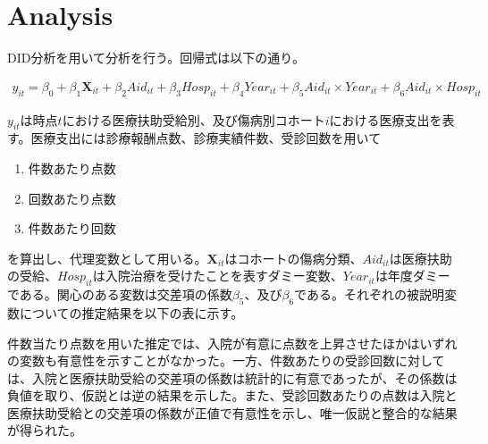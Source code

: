 \documentclass{jsarticle}
\begin{document}
\section{Analysis}

DID分析を用いて分析を行う。回帰式は以下の通り。

 \begin{align*}
 y_{it} = \beta_0 + \beta_1 \mathbf{X}_{it} + \beta_2 \textit{Aid}_{it} + \beta_3 \textit{Hosp}_{it} +
 \beta_4 \textit{Year}_{it} + \beta_5 \textit{Aid}_{it} \times \textit{Year}_{it} + \beta_6 \textit{Aid}_{it} \times \textit{Hosp}_{it} 
 \end{align*}

$y_{it}$は時点$t$における医療扶助受給別、及び傷病別コホート$i$における医療支出を表す。医療支出には診療報酬点数、診療実績件数、受診回数を用いて

 \begin{enumerate}
 
 \item 件数あたり点数
 
 \item 回数あたり点数
 
 \item 件数あたり回数
 
 \end{enumerate}

を算出し、代理変数として用いる。$\mathbf{X}_{it}$はコホートの傷病分類、$\textit{Aid}_{it}$は医療扶助の受給、$\textit{Hosp}_{it}$は入院治療を受けたことを表すダミー変数、$\textit{Year}_{it}$は年度ダミーである。関心のある変数は交差項の係数$\beta_5$、及び$\beta_6$である。それぞれの被説明変数についての推定結果を以下の表に示す。

 件数当たり点数を用いた推定では、入院が有意に点数を上昇させたほかはいずれの変数も有意性を示すことがなかった。一方、件数あたりの受診回数に対しては、入院と医療扶助受給の交差項の係数は統計的に有意であったが、その係数は負値を取り、仮説とは逆の結果を示した。また、受診回数あたりの点数は入院と医療扶助受給との交差項の係数が正値で有意性を示し、唯一仮説と整合的な結果が得られた。
 
\end{document}
